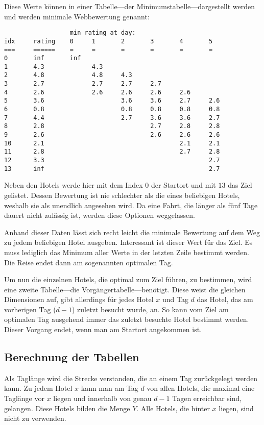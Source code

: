 \documentclass[a4paper,10pt,ngerman]{scrartcl}
\begin{document}
Diese Werte können in einer Tabelle---der Minimumstabelle---dargestellt werden und werden minimale Webbewertung genannt:
\begin{lstlisting}
                  min rating at day:
idx     rating    0     1       2       3       4       5
===     ======    =     =       =       =       =       =
0       inf       inf
1       4.3             4.3
2       4.8             4.8     4.3
3       2.7             2.7     2.7     2.7
4       2.6             2.6     2.6     2.6     2.6
5       3.6                     3.6     3.6     2.7     2.6
6       0.8                     0.8     0.8     0.8     0.8
7       4.4                     2.7     3.6     3.6     2.7
8       2.8                             2.7     2.8     2.8
9       2.6                             2.6     2.6     2.6
10      2.1                                     2.1     2.1
11      2.8                                     2.7     2.8
12      3.3                                             2.7
13      inf                                             2.7
\end{lstlisting}
Neben den Hotels werde hier mit dem Index $0$ der Startort und mit $13$ das Ziel gelistet.
Dessen Bewertung ist nie schlechter als die eines beliebigen Hotels, weshalb sie als unendlich angesehen wird.
Da eine Fahrt, die länger als fünf Tage dauert nicht zulässig ist, werden diese Optionen weggelassen.

Anhand dieser Daten lässt sich recht leicht die minimale Bewertung auf dem Weg zu jedem beliebigen Hotel ausgeben.
Interessant ist dieser Wert für das Ziel.
Es muss lediglich das Minimum aller Werte in der letzten Zeile bestimmt werden.
Die Reise endet dann am sogenannten optimalen Tag.

Um nun die einzelnen Hotels, die optimal zum Ziel führen, zu bestimmen, wird eine zweite Tabelle---die Vorgängertabelle---benötigt.
Diese weist die gleichen Dimensionen auf, gibt allerdings für jedes Hotel $x$ und Tag $d$ das Hotel, das am vorherigen Tag ($d-1$) zuletzt besucht wurde, an.
So kann vom Ziel am optimalen Tag ausgehend immer das zuletzt besuchte Hotel bestimmt werden.
Dieser Vorgang endet, wenn man am Startort angekommen ist.

\subsection{Berechnung der Tabellen}
Als Taglänge wird die Strecke verstanden, die an einem Tag zurückgelegt werden kann.
Zu jedem Hotel $x$ kann man am Tag $d$ von allen Hotels, die maximal eine Taglänge vor $x$ liegen und innerhalb von genau $d-1$ Tagen erreichbar sind, gelangen.
Diese Hotels bilden die Menge $Y$.
Alle Hotels, die hinter $x$ liegen, sind nicht zu verwenden.
\end{document}
